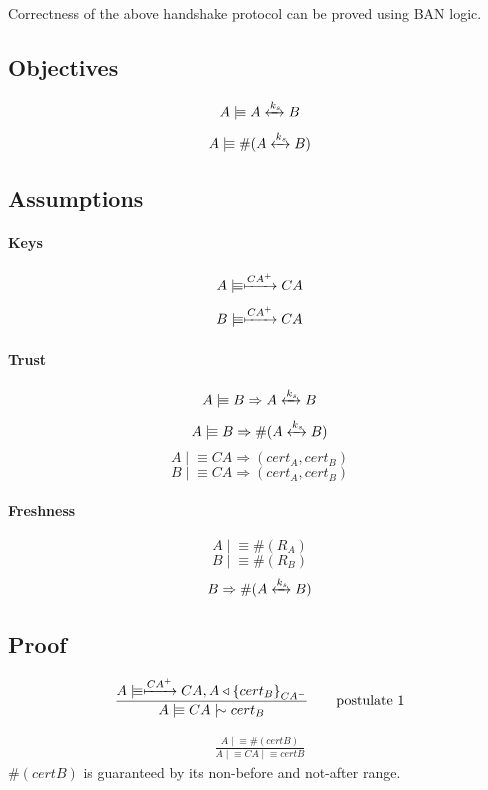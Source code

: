 \documentclass[a4paper,12pt]{article}
\newcommand{\believes}{\mid\!\equiv}
\newcommand{\sees}{\triangleleft}
\newcommand{\oncesaid}{\mid\!\sim}
\newcommand{\controls}{\Rightarrow}
\newcommand{\fresh}[1]{\#(#1)}
\newcommand{\encrypt}[2]{{ \{ #1 \} }_{#2}}
\newcommand{\sharekey}[1]{\xleftrightarrow{#1}}
\newcommand{\pubkey}[1]{\xmapsto{#1}}
\begin{document}
Correctness of the above handshake protocol can be proved using BAN logic.

\subsection{Objectives}

\[A \believes A \sharekey{k_s} B \]
\[A \believes \fresh{A \sharekey{k_s} B} \]

\subsection{Assumptions}

\paragraph{Keys}

\[A \believes \pubkey{CA^+} CA \]
\[B \believes \pubkey{CA^+} CA \]

\paragraph{Trust}

\[A \believes B \controls A \sharekey{k_s} B \]
\[A \believes B \controls \fresh{A \sharekey{k_s} B} \]
\[A \believes CA \controls (cert_A, cert_B) \]
\[B \believes CA \controls (cert_A, cert_B) \]

\paragraph{Freshness}

\[A \believes \fresh{R_A} \]
\[B \believes \fresh{R_B} \]
\[B \controls \fresh{A \sharekey{k_s} B} \]

\subsection{Proof}

\begin{align}
\frac{A \believes \pubkey{CA^+} CA, A \sees \encrypt{cert_B}{CA^-}}{A \believes CA \oncesaid cert_B} \tag*{postulate 1}
\end{align}

\begin{align}
\frac{A \believes \fresh{certB}}{A \believes CA \believes certB} \tag*{postulate 2}
\end{align}
$\fresh{certB}$ is guaranteed by its non-before and not-after range.
\end{document}
